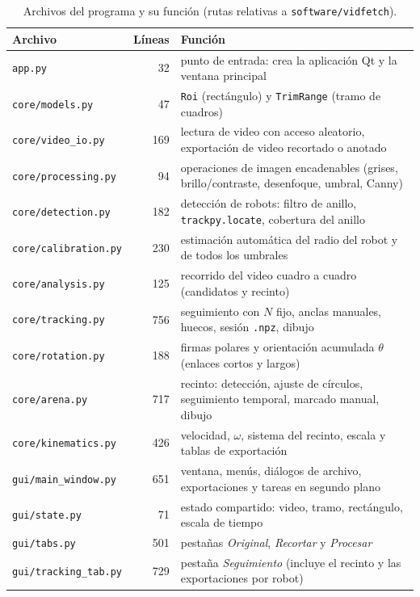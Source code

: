 \begin{table}[H]
  \centering
  \caption{Archivos del programa y su función (rutas relativas a \texttt{software/vidfetch}).}
  \label{tab:archivos}
  \small
  \begin{tabular}{@{}lrp{9.2cm}@{}}
    \toprule
    Archivo & Líneas & Función \\
    \midrule
    \texttt{app.py} & 32 & punto de entrada: crea la aplicación Qt y la ventana principal \\
    \texttt{core/models.py} & 47 & \texttt{Roi} (rectángulo) y \texttt{TrimRange} (tramo de cuadros) \\
    \texttt{core/video\_io.py} & 169 & lectura de video con acceso aleatorio, exportación de video recortado o anotado \\
    \texttt{core/processing.py} & 94 & operaciones de imagen encadenables (grises, brillo/contraste, desenfoque, umbral, Canny) \\
    \texttt{core/detection.py} & 182 & detección de robots: filtro de anillo, \texttt{trackpy.locate}, cobertura del anillo \\
    \texttt{core/calibration.py} & 230 & estimación automática del radio del robot y de todos los umbrales \\
    \texttt{core/analysis.py} & 125 & recorrido del video cuadro a cuadro (candidatos y recinto) \\
    \texttt{core/tracking.py} & 756 & seguimiento con $N$ fijo, anclas manuales, huecos, sesión \texttt{.npz}, dibujo \\
    \texttt{core/rotation.py} & 188 & firmas polares y orientación acumulada $\theta$ (enlaces cortos y largos) \\
    \texttt{core/arena.py} & 717 & recinto: detección, ajuste de círculos, seguimiento temporal, marcado manual, dibujo \\
    \texttt{core/kinematics.py} & 426 & velocidad, $\omega$, sistema del recinto, escala y tablas de exportación \\
    \midrule
    \texttt{gui/main\_window.py} & 651 & ventana, menús, diálogos de archivo, exportaciones y tareas en segundo plano \\
    \texttt{gui/state.py} & 71 & estado compartido: video, tramo, rectángulo, escala de tiempo \\
    \texttt{gui/tabs.py} & 501 & pestañas \emph{Original}, \emph{Recortar} y \emph{Procesar} \\
    \texttt{gui/tracking\_tab.py} & 729 & pestaña \emph{Seguimiento} (incluye el recinto y las exportaciones por robot) \\

\end{tabular}
\end{table}
